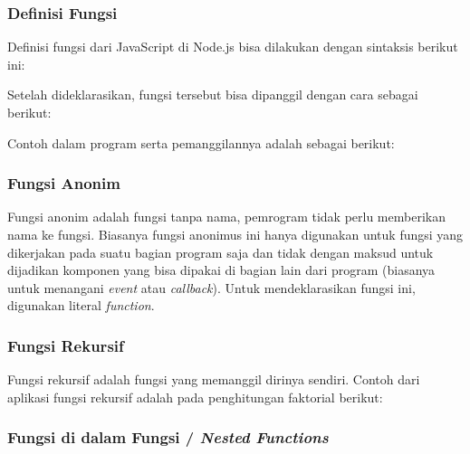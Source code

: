 \subsubsection{Definisi Fungsi}

Definisi fungsi dari JavaScript di Node.js bisa dilakukan dengan sintaksis berikut ini:

\lstset{language=JavaScript,caption=Sintaksis Fungsi dalam JavaScript}


Setelah dideklarasikan, fungsi tersebut bisa dipanggil dengan cara sebagai berikut:

\lstset{language=JavaScript,caption=Pemanggilan Fungsi dalam JavaScript}


Contoh dalam program serta pemanggilannya adalah sebagai berikut:

\lstset{language=bash,caption=Contoh deklarasi fungsi dan pemanggilannya}


\subsubsection{Fungsi Anonim}

Fungsi anonim adalah fungsi tanpa nama, pemrogram tidak perlu memberikan nama ke fungsi. Biasanya fungsi anonimus ini hanya digunakan untuk fungsi yang dikerjakan pada suatu bagian program saja dan tidak dengan maksud untuk dijadikan komponen yang bisa dipakai di bagian lain dari program (biasanya untuk menangani \textit{event} atau \textit{callback}). Untuk mendeklarasikan fungsi ini, digunakan literal \textit{function}.

\lstset{language=JavaScript,caption=Fungsi anonim}


\subsubsection{Fungsi Rekursif}

Fungsi rekursif adalah fungsi yang memanggil dirinya sendiri. Contoh dari aplikasi fungsi rekursif adalah pada penghitungan faktorial berikut:

\lstset{language=JavaScript,caption=Fungsi rekursif untuk menghitung faktorial}


\subsubsection{Fungsi di dalam Fungsi / \textit{Nested Functions}}

